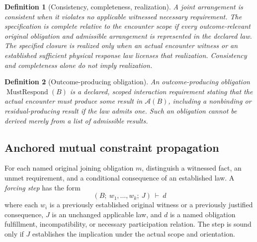 \documentclass[11pt]{article}
\newtheorem{definition}{Definition}[section]
\begin{document}
\begin{definition}[Consistency, completeness, realization]
A joint arrangement is \emph{consistent} when it violates no
applicable witnessed necessary requirement. The specification
is \emph{complete relative to the encounter scope} if every
outcome-relevant original obligation and admissible arrangement
is represented in the declared law. The specified \emph{closure}
is realized only when an actual encounter witness or an
established sufficient physical response law licenses that
realization. Consistency and completeness alone do not imply
realization.
\end{definition}

\begin{definition}[Outcome-producing obligation]
An outcome-producing obligation $\operatorname{MustRespond}(B)$
is a declared, scoped interaction requirement stating that
the actual encounter must produce some result in
$\mathcal A(B)$, including a nonbinding or residual-producing
result if the law admits one. Such an obligation cannot be
derived merely from a list of admissible results.
\end{definition}

\subsection{Anchored mutual constraint propagation}
For each named original joining obligation $m$, distinguish
a witnessed fact, an unmet requirement, and a conditional
consequence of an established law. A \emph{forcing step}
has the form
\[
  (B;\ w_1,\ldots,w_k;\ J)\ \vdash\ d
\]
where each $w_i$ is a previously established original
witness or a previously justified consequence, $J$ is an
unchanged applicable law, and $d$ is a named obligation
fulfillment, incompatibility, or necessary participation
relation. The step is sound only if $J$ establishes the
implication under the actual scope and orientation.
\end{document}
